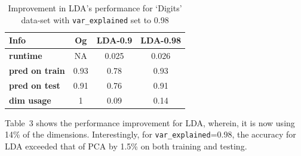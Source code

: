 \documentclass[12pt]{article}
\begin{document}
\begin{table}[!hptb]
\centering
\begin{tabular}{|l|c|c|c|}
\hline
\textbf{Info} & \textbf{Og} & \textbf{LDA-0.9} & \textbf{LDA-0.98} \\\hline
\textbf{runtime} & NA & 0.025 & 0.026\\
\textbf{pred on train} & 0.93 & 0.78 & 0.93 \\
\textbf{pred on test} & 0.91 & 0.76 & 0.91 \\
\textbf{dim usage} & 1 & 0.09 & 0.14 \\\hline
\end{tabular}
\caption{Improvement in LDA's performance for `Digits' data-set with \texttt{var\_explained} set to 0.98}
\end{table}

Table~3 shows the performance improvement for LDA, wherein, it is now using 14\% of the dimensions. Interestingly, for  \texttt{var\_explained}=0.98, the accuracy for LDA exceeded that of PCA by 1.5\% on both training and testing.
\end{document}
